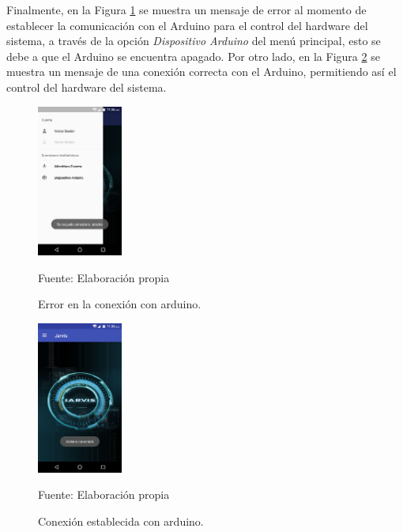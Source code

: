Finalmente, en la Figura \ref{fig:figura3.60} se muestra un mensaje de error al momento de establecer la comunicación con el Arduino para el control del hardware del sistema, a través de la opción \textit{Dispositivo Arduino} del menú principal, esto se debe a que el Arduino se encuentra apagado. Por otro lado, en la Figura \ref{fig:figura3.61} se muestra un mensaje de una conexión correcta con el Arduino, permitiendo así el control del hardware del sistema.
\begin{figure}[H]
\captionsetup{justification=centering}
\begin{center}
\includegraphics[width=0.25\textwidth]{Imagenes/Cap3/image060}
\end{center}
\begin{center}
\vskip -0.5cm
\caption{\small{Error en la conexión con arduino.}}
\label{fig:figura3.60}
{\small{Fuente: Elaboración propia}}
\end{center}
\end{figure}

\begin{figure}[H]
\captionsetup{justification=centering}
\begin{center}
\includegraphics[width=0.25\textwidth]{Imagenes/Cap3/image061}
\end{center}
\begin{center}
\vskip -0.5cm
\caption{\small{Conexión establecida con arduino.}}
\label{fig:figura3.61}
{\small{Fuente: Elaboración propia}}
\end{center}
\end{figure}

